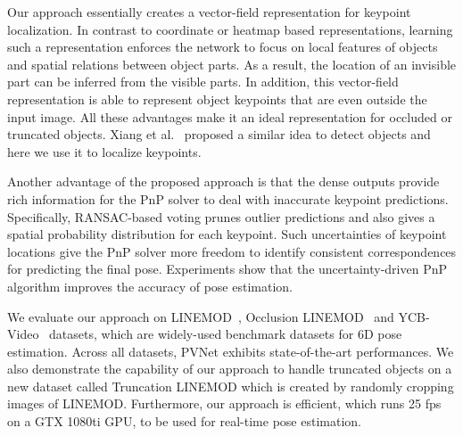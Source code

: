 \documentclass[10pt,twocolumn,letterpaper]{article}
\begin{document}
Our approach essentially creates a vector-field representation for keypoint localization. In contrast to coordinate or heatmap based representations, learning such a representation enforces the network to focus on local features of objects and spatial relations between object parts. As a result, the location of an invisible part can be inferred from the visible parts. In addition, this vector-field representation is able to represent object keypoints that are even outside the input image. All these advantages make it an ideal representation for occluded or truncated objects. Xiang et al.~\cite{xiang2017posecnn} proposed a similar idea to detect objects and here we use it to localize keypoints. 

Another advantage of the proposed approach is that the dense outputs provide rich information for the PnP solver to deal with inaccurate keypoint predictions. Specifically, RANSAC-based voting prunes outlier predictions and also gives a spatial probability distribution for each keypoint. Such uncertainties of keypoint locations give the PnP solver more freedom to identify consistent correspondences for predicting the final pose. Experiments show that the uncertainty-driven PnP algorithm improves the accuracy of pose estimation.

We evaluate our approach on  LINEMOD~\cite{hinterstoisser2012model}, Occlusion LINEMOD~\cite{brachmann2014learning} and YCB-Video~\cite{xiang2017posecnn} datasets, which are widely-used benchmark datasets for 6D pose estimation. Across all datasets, PVNet exhibits state-of-the-art performances. We also demonstrate the capability of our approach to handle truncated objects on a new dataset called Truncation LINEMOD which is created by randomly cropping images of LINEMOD. Furthermore, our approach is efficient, which runs 25 fps on a GTX 1080ti GPU, to be used for real-time pose estimation.
\end{document}
